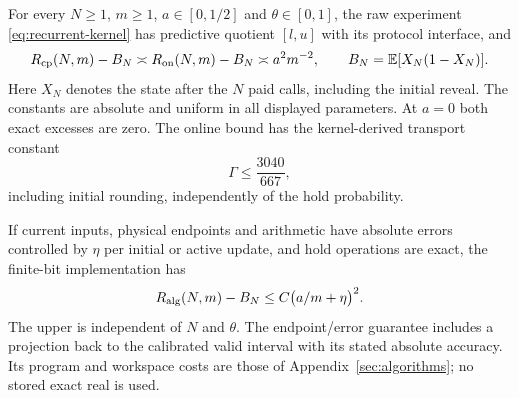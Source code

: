 \begin{theorem}\label{thm:recurrent}
For every $N\ge1$, $m\ge1$, $a\in[0,1/2]$ and $\theta\in[0,1]$, the raw experiment \eqref{eq:recurrent-kernel} has predictive quotient $[l,u]$ with its protocol interface, and
\begin{equation}\label{eq:recurrent-risk}
 R_{\mathrm{cp}}(N,m)-B_N\asymp R_{\mathrm{on}}(N,m)-B_N\asymp a^2m^{-2},
 \qquad B_N=\mathbb E[X_N(1-X_N)].
\end{equation}
Here $X_N$ denotes the state after the $N$ paid calls, including the initial reveal. The constants are absolute and uniform in all displayed parameters. At $a=0$ both exact excesses are zero. The online bound has the kernel-derived transport constant
\begin{equation}\label{eq:recurrent-gamma}
 \Gamma\le\frac{3040}{667},
\end{equation}
including initial rounding, independently of the hold probability.

If current inputs, physical endpoints and arithmetic have absolute errors controlled by $\eta$ per initial or active update, and hold operations are exact, the finite-bit implementation has
\[
 R_{\rm alg}(N,m)-B_N\le C\bigl(a/m+\eta\bigr)^2.
\]
The upper is independent of $N$ and $\theta$. The endpoint/error guarantee includes a projection back to the calibrated valid interval with its stated absolute accuracy. Its program and workspace costs are those of Appendix~\ref{sec:algorithms}; no stored exact real is used.
\end{theorem}
